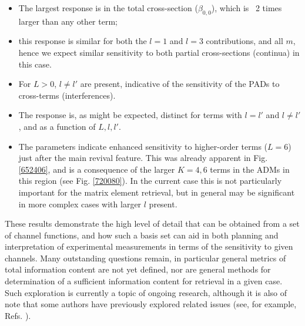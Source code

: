 \documentclass[10pt]{article}
\begin{document}
\begin{itemize}
\item The largest response is in the total cross-section ($\beta_{0,0}$), which is ~2 times larger than any other term; 
\item this response is similar for both the $l=1$ and $l=3$ contributions, and all $m$, hence we expect similar sensitivity to both partial cross-sections (continua) in this case.
\item For $L>0$, $l\neq l'$ are present, indicative of the sensitivity of the PADs to cross-terms (interferences).
\item The response is, as might be expected, distinct for terms with $l=l'$ and $l\neq l'$, and as a function of $L,l,l'$.
\item The parameters indicate enhanced sensitivity to higher-order terms ($L=6$) just after the main revival feature. This was already apparent in Fig. \ref{652406}, and is a consequence of the larger $K=4,6$ terms in the ADMs in this region (see Fig. \ref{720080}). In the current case this is not particularly important for the matrix element retrieval, but in general may be significant in more complex cases with larger $l$ present.

\end{itemize}

These results demonstrate the high level of detail that can be obtained from a set of channel functions, and how such a basis set can aid in both planning and interpretation of experimental measurements in terms of the sensitivity to given channels. Many outstanding questions remain, in particular general metrics of total information content are not yet defined, nor are general methods for determination of a sufficient information content for retrieval in a given case. Such exploration is currently a topic of ongoing research, although it is also of note that some authors have previously explored related issues (see, for example, Refs. \cite{Schmidtke2000,Ramakrishna2012}).


\end{document}
